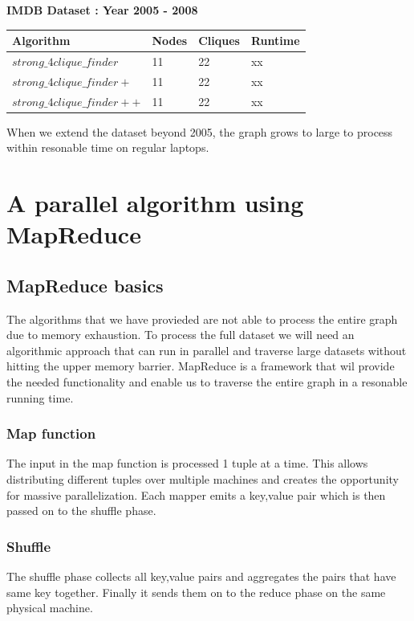 \documentclass{article}
\begin{document}
\textbf{IMDB Dataset : Year 2005 - 2008}
\begin{center}
    \begin{tabular}{ | l | l | l | l |}
    \hline
    Algorithm & Nodes & Cliques & Runtime \\ \hline
    $strong\_4clique\_finder$ & 11 & 22 & xx \\ \hline
    $strong\_4clique\_finder+$ & 11 & 22 & xx \\ \hline
    $strong\_4clique\_finder++$ & 11 & 22 & xx \\ \hline
    \end{tabular}
\end{center}
When we extend the dataset beyond 2005, the graph grows to large to process within resonable time on regular laptops.

\section{A parallel algorithm using MapReduce}

\subsection{MapReduce basics}
The algorithms that we have provieded are not able to process the entire graph due to memory exhaustion. To process the full dataset we will need an algorithmic approach that can run in parallel and traverse large datasets without hitting the upper memory barrier. MapReduce is a framework that wil provide the needed functionality and enable us to traverse the entire graph in a resonable running time.

\subsubsection{Map function}
The input in the map function is processed 1 tuple at a time. This allows distributing different tuples over multiple machines and creates the opportunity for massive parallelization. Each mapper emits a key,value pair which is then passed on to the shuffle phase.

\subsubsection{Shuffle}
The shuffle phase collects all key,value pairs and aggregates the pairs that have same key together. Finally it sends them on to the reduce phase on the same physical machine.
\end{document}
